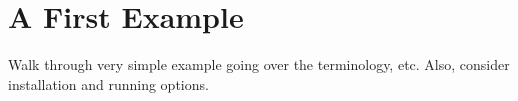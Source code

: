\section{A First Example}
Walk through very simple example going over the terminology, etc.  Also, consider installation and running options.
